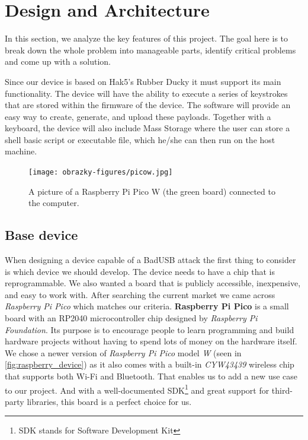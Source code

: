
\chapter{Design and Architecture}
\label{ch:design_and_architecture}
In this section, we analyze the key features of this project. The goal here is to break down the whole problem into manageable parts, identify critical problems and come up with a solution.

Since our device is based on Hak5's Rubber Ducky it must support its main functionality. The device will have the ability to execute a series of keystrokes that are stored within the firmware of the device. The software will provide an easy way to create, generate, and upload these payloads. Together with a keyboard, the device will also include Mass Storage where the user can store a shell basic script or executable file, which he/she can then run on the host machine.

\begin{figure}[ht]
    \centering
    \texttt{[image: obrazky-figures/picow.jpg]}
    \caption{A picture of a Raspberry Pi Pico W (the green board) connected to the computer.}
    \label{fig:raspberry_device}
\end{figure}

\section{Base device}
\label{sec:design_base_device}
When designing a device capable of a BadUSB attack the first thing to consider is which device we should develop. The device needs to have a chip that is reprogrammable. We also wanted a board that is publicly accessible, inexpensive, and easy to work with. After searching the current market we came across \emph{Raspberry Pi Pico} which matches our criteria. \textbf{Raspberry Pi Pico} is a small board with an RP2040 microcontroller chip designed by \emph{Raspberry Pi Foundation}. Its purpose is to encourage people to learn programming and build hardware projects without having to spend lots of money on the hardware itself. We chose a newer version of \emph{Raspberry Pi Pico} model \emph{W} (seen in \autoref{fig:raspberry_device}) as it also comes with a built-in \emph{CYW43439} wireless chip that supports both Wi-Fi and Bluetooth. That enables us to add a new use case to our project. And with a well-documented SDK\footnote{SDK stands for Software Development Kit} and great support for third-party libraries, this board is a perfect choice for us.

